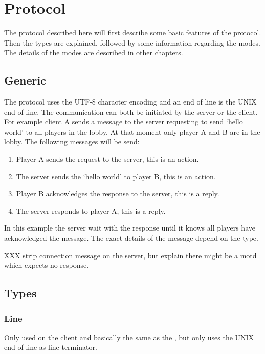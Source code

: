 \chapter{Protocol}
\label{chapter:protocol}

The protocol described here will first describe some basic features of the
protocol. Then the types are explained, followed by some information
regarding the modes. The details of the modes are described in other
chapters.

\section{Generic}
\label{section:protocol:generic}

The protocol uses the UTF-8 character encoding and an end of line is the
UNIX end of line. The communication can both be initiated by the server or
the client. For example client A sends a message to the server requesting
to send `hello world' to all players in the lobby. At that moment only
player A and B are in the lobby. The following messages will be send:
\begin{enumerate}
\item
	Player A sends the request to the server, this is an action.
\item
	The server sends the `hello world' to player B, this is an action.
\item
	Player B acknowledges the response to the server, this is a reply.
\item
	The server responds to player A, this is a reply.
\end{enumerate}

In this example the server wait with the response until it knows all players
have acknowledged the message. The exact details of the message depend on
the type.

XXX strip connection message on the server, but explain there might be a
motd which expects no response.

\section{Types}
\label{section:protocol:types}




\subsection{Line}
\label{protocol:line}

Only used on the client and basically the same as the
, but only uses the UNIX end of line as line
terminator.


